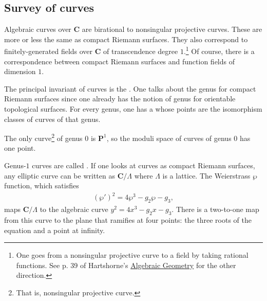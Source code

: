 \documentclass [11 pt, oneside, margin = 1 in] {article}
\begin{document}
\subsection{Survey of curves}
Algebraic curves over $\mathbf{C}$ are birational to nonsingular projective curves. These are more or less the same as compact Riemann surfaces. They also correspond to finitely-generated fields over $\mathbf{C}$ of transcendence degree $1$.\footnote{One goes from a nonsingular projective curve to a field by taking rational functions. See p. 39 of Hartshorne's \underline{Algebraic Geometry} for the other direction.} Of course, there is a correspondence between compact Riemann surfaces and function fields of dimension $1$.

The principal invariant of curves is the . One talks about the genus for compact Riemann surfaces since one already has the notion of genus for orientable topological surfaces. For every genus, one has a  whose points are the isomorphism classes of curves of that genus.

The only curve\footnote{That is, nonsingular projective curve.} of genus $0$ is $\mathbf{P}^1$, so the moduli space of curves of genus $0$ has one point.

Genus-$1$ curves are called . If one looks at curves as compact Riemann surfaces, any elliptic curve can be written as $\mathbf{C}/\Lambda$ where $\Lambda$ is a lattice. The Weierstrass $\wp$ function, which satisfies
\begin{align*}
	(\wp') ^2 = 4\wp^3 -g_2\wp-g_3,
\end{align*}
maps $\mathbf{C}/\Lambda$ to the algebraic curve $y^2=4x^3-g_2x-g_3$. There is a two-to-one map from this curve to the plane that ramifies at four points: the three roots of the equation and a point at infinity.
\end{document}
